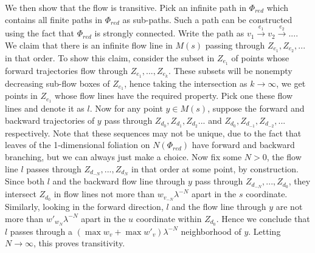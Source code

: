 \documentclass[12pt]{amsart}
\theoremstyle{definition}
\numberwithin{equation}{section}
\begin{document}
We then show that the flow is transitive. Pick an infinite path in $\Phi_{red}$ which contains all finite paths in $\Phi_{red}$ as sub-paths. Such a path can be constructed using the fact that $\Phi_{red}$ is strongly connected. Write the path as $v_1 \overset{e_1}{\to} v_2 \overset{e_2}{\to} ...$. We claim that there is an infinite flow line in $M(s)$ passing through $Z_{e_1},Z_{e_2},...$ in that order. To show this claim, consider the subset in $Z_{e_1}$ of points whose forward trajectories flow through $Z_{e_1},...,Z_{e_k}$. These subsets will be nonempty decreasing sub-flow boxes of $Z_{e_1}$, hence taking the intersection as $k \to \infty$, we get points in $Z_{e_1}$ whose flow lines have the required property. Pick one these flow lines and denote it as $l$. Now for any point $y \in M(s)$, suppose the forward and backward trajectories of $y$ pass through $Z_{d_0}, Z_{d_1}, Z_{d_2}...$ and $Z_{d_0}, Z_{d_{-1}}, Z_{d_{-2}},...$ respectively. Note that these sequences may not be unique, due to the fact that leaves of the 1-dimensional foliation on $N(\Phi_{red})$ have forward and backward branching, but we can always just make a choice. Now fix some $N>0$, the flow line $l$ passes through $Z_{d_{-N}},...,Z_{d_N}$ in that order at some point, by construction. Since both $l$ and the backward flow line through $y$ pass through $Z_{d_{-N}},...,Z_{d_0}$, they intersect $Z_{d_0}$ in flow lines not more than $w_{v_{-N}} \lambda^{-N}$ apart in the $s$ coordinate. Similarly, looking in the forward direction, $l$ and the flow line through $y$ are not more than $w'_{w_N} \lambda^{-N}$ apart in the $u$ coordinate within $Z_{d_0}$. Hence we conclude that $l$ passes through a $(\max w_v+\max w'_v) \lambda^{-N}$ neighborhood of $y$. Letting $N \to \infty$, this proves transitivity.
\end{document}
